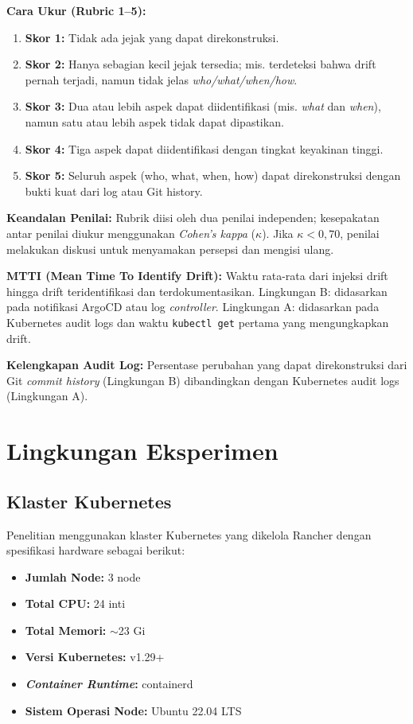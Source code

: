 \textbf{Cara Ukur (Rubric 1--5):}
\begin{enumerate}
    \item \textbf{Skor 1:} Tidak ada jejak yang dapat direkonstruksi.
    \item \textbf{Skor 2:} Hanya sebagian kecil jejak tersedia; mis. terdeteksi bahwa drift pernah terjadi, namun tidak jelas \textit{who/what/when/how}.
    \item \textbf{Skor 3:} Dua atau lebih aspek dapat diidentifikasi (mis. \textit{what} dan \textit{when}), namun satu atau lebih aspek tidak dapat dipastikan.
    \item \textbf{Skor 4:} Tiga aspek dapat diidentifikasi dengan tingkat keyakinan tinggi.
    \item \textbf{Skor 5:} Seluruh aspek (who, what, when, how) dapat direkonstruksi dengan bukti kuat dari log atau Git history.
\end{enumerate}

\textbf{Keandalan Penilai:} Rubrik diisi oleh dua penilai independen; kesepakatan antar penilai diukur menggunakan \textit{Cohen's kappa} ($\kappa$). Jika $\kappa < 0{,}70$, penilai melakukan diskusi untuk menyamakan persepsi dan mengisi ulang.

\textbf{MTTI (Mean Time To Identify Drift):} Waktu rata-rata dari injeksi drift hingga drift teridentifikasi dan terdokumentasikan. Lingkungan B: didasarkan pada notifikasi ArgoCD atau log \textit{controller}. Lingkungan A: didasarkan pada Kubernetes audit logs dan waktu \texttt{kubectl get} pertama yang mengungkapkan drift.

\textbf{Kelengkapan Audit Log:} Persentase perubahan yang dapat direkonstruksi dari Git \textit{commit history} (Lingkungan B) dibandingkan dengan Kubernetes audit logs (Lingkungan A).

\section{Lingkungan Eksperimen}

\subsection{Klaster Kubernetes}

Penelitian menggunakan klaster Kubernetes yang dikelola Rancher dengan spesifikasi hardware sebagai berikut:

\begin{itemize}
    \item \textbf{Jumlah Node:} 3 node
    \item \textbf{Total CPU:} 24 inti
    \item \textbf{Total Memori:} $\sim$23 Gi
    \item \textbf{Versi Kubernetes:} v1.29+
    \item \textbf{\textit{Container Runtime}:} containerd
    \item \textbf{Sistem Operasi Node:} Ubuntu 22.04 LTS
\end{itemize}

